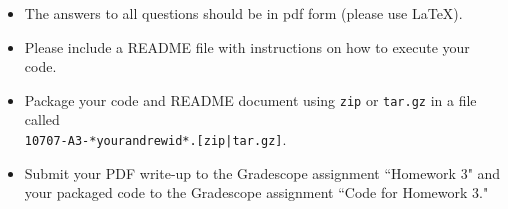 \documentclass[10pt]{article}
\begin{document}
\begin{itemize}
\item 
The answers to all questions
should be in pdf form (please use \LaTeX).
\item Please include a README file with instructions on how to execute your code.

\item Package your code and README document using
\texttt{zip} or \texttt{tar.gz} in a file called \\
\texttt{10707-A3-*yourandrewid*.[zip|tar.gz]}. 

\item Submit your PDF write-up to the Gradescope assignment ``Homework 3" and your packaged code to the Gradescope assignment ``Code for Homework 3." 

\end{itemize}



\end{document}
